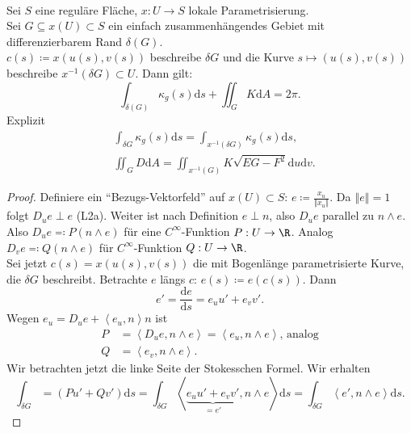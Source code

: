 \begin{theorem}
  \ \\
  Sei $ S $ eine reguläre Fläche, $ x: U \to S $ lokale Parametrisierung. \\
  Sei $ G \subseteq x(U) \subset S $ ein einfach zusammenhängendes Gebiet mit differenzierbarem Rand $ \delta(G) $. \\
  $ c(s) \coloneqq x(u(s), v(s)) $ beschreibe $ \delta G $ und die Kurve $ s \mapsto (u(s), v(s)) $ beschreibe $ x^{-1}(\delta G) \subset U $. Dann gilt:
  \begin{equation*}
    \int_{\delta(G)}\kappa_g(s)\text{d}s + \iint_G K\text{d}A = 2\pi\text{.}
  \end{equation*}  
  Explizit
  \begin{align*}
    &\int_{\delta G}\kappa_g(s)\text{d} s = \int_{x^{-1}(\delta G)} \kappa_g(s)\text{d} s\text{,} \\
    &\iint_{G}D\text{d}A = \iint_{x^{-1}(G)}K\sqrt{EG - F^2}\text{d}u\text{d}v\text{.}
  \end{align*}
  \begin{proof}
    Definiere ein ``Bezugs-Vektorfeld'' auf $ x(U) \subset S $: $ e \coloneqq \frac{x_u}{\left\Vert x_u \right\Vert} $. Da $ \left\Vert e \right\Vert = 1 $ folgt $ D_ue \perp e $ (L2a). Weiter ist nach Definition $ e \perp n $, also $ D_ue $ parallel zu $ n \wedge e $. Also $ D_u e \eqqcolon P(n \wedge e) $ für eine $ C^\infty $-Funktion $ P : U \to \R $. Analog $ D_ve \eqqcolon Q(n \wedge e) $ für $ C^\infty $-Funktion $ Q: U \to \R $. \\
    Sei jetzt $ c(s) = x(u(s),v(s)) $ die mit Bogenlänge parametrisierte Kurve, die $ \delta G $ beschreibt. Betrachte $ e $ längs $ c $: $ e(s) \coloneqq e(c(s)) $. Dann
    \begin{equation*}
      e' = \frac{\text{d}e}{\text{d}s} = e_uu' + e_vv'\text{.}
    \end{equation*}
    Wegen $ e_u = D_ue + \left\langle e_u,n \right\rangle n $ ist
    \begin{align*}
      P &= \left\langle D_ue, n \wedge e \right\rangle = \left\langle e_u, n \wedge e \right\rangle\text{, analog} \\
      Q &= \left\langle e_v, n \wedge e \right\rangle\text{.}
    \end{align*}
    Wir betrachten jetzt die linke Seite der Stokesschen Formel. Wir erhalten
    \begin{equation}\label{eq:GB1}
      \int_{\delta G} = (Pu' + Qv')\text{d}s = \int_{\delta G}\left\langle \underbrace{e_uu' + e_vv'}_{=e'}, n \wedge e \right\rangle \text{d}s = \int_{\delta G}\left\langle e', n \wedge e \right\rangle \text{d}s\text{.}

\end{equation}
\end{proof}
\end{theorem}
